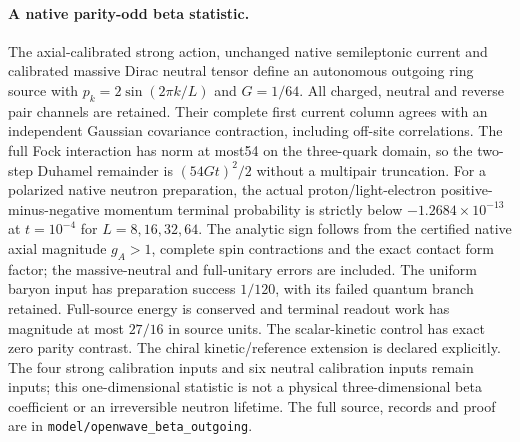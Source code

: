 \paragraph{A native parity-odd beta statistic.}
The axial-calibrated strong action, unchanged native semileptonic current
and calibrated massive Dirac neutral tensor define an autonomous outgoing
ring source with $p_k=2\sin(2\pi k/L)$ and $G=1/64$.  All charged,
neutral and reverse pair channels are retained.  Their complete first
current column agrees with an independent Gaussian covariance contraction,
including off-site correlations.  The full Fock interaction has norm at
most54 on the three-quark domain, so the two-step Duhamel remainder is
$(54Gt)^2/2$ without a multipair truncation.
For a polarized native neutron preparation, the actual proton/light-electron
positive-minus-negative momentum terminal probability is strictly below
$-1.2684\times10^{-13}$ at $t=10^{-4}$ for $L=8,16,32,64$.
The analytic sign follows from the certified native axial magnitude
$g_A>1$, complete spin contractions and the exact contact form factor;
the massive-neutral and full-unitary errors are included.  The uniform
baryon input has preparation success $1/120$, with its failed quantum
branch retained.  Full-source energy is conserved and terminal readout
work has magnitude at most $27/16$ in source units.
The scalar-kinetic control has exact zero parity contrast.  The chiral
kinetic/reference extension is declared explicitly.  The four strong
calibration inputs and six neutral calibration inputs remain inputs;
this one-dimensional statistic is not a physical three-dimensional beta
coefficient or an irreversible neutron lifetime.  The full source,
records and proof are in \texttt{model/openwave\_beta\_outgoing}.
